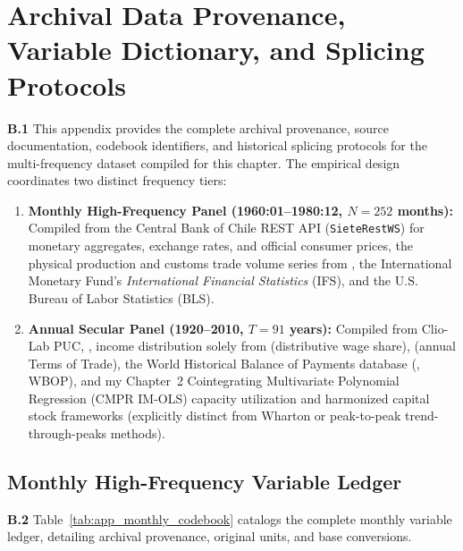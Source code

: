 \section{Archival Data Provenance, Variable Dictionary, and Splicing Protocols}
\label{app:archival_codebook}
\label{app:codebook}

\textbf{B.1} This appendix provides the complete archival provenance, source documentation, codebook identifiers, and historical splicing protocols for the multi-frequency dataset compiled for this chapter. The empirical design coordinates two distinct frequency tiers:
\begin{enumerate}[leftmargin=2em]
	\item \textbf{Monthly High-Frequency Panel (1960:01--1980:12, $N=252$ months):} Compiled from the Central Bank of Chile REST API (\texttt{SieteRestWS}) for monetary aggregates, exchange rates, and official consumer prices, the physical production and customs trade volume series from \citet{DiazBahamonde2023}, the International Monetary Fund's \textit{International Financial Statistics} (IFS), and the U.S. Bureau of Labor Statistics (BLS).
	\item \textbf{Annual Secular Panel (1920--2010, $T=91$ years):} Compiled from Clio-Lab PUC, \citet{Braun2000}, income distribution solely from \citet{Astorga2023} (distributive wage share), \citet{DiazLudersWagner2016} (annual Terms of Trade), the World Historical Balance of Payments database (\citealt{NievasPiketty2025}, WBOP), and my Chapter~2 Cointegrating Multivariate Polynomial Regression (CMPR IM-OLS) capacity utilization and harmonized capital stock frameworks (explicitly distinct from Wharton or peak-to-peak trend-through-peaks methods).
\end{enumerate}

\subsection{Monthly High-Frequency Variable Ledger}
\label{app:monthly_ledger}

\textbf{B.2} Table~\ref{tab:app_monthly_codebook} catalogs the complete monthly variable ledger, detailing archival provenance, original units, and base conversions.

